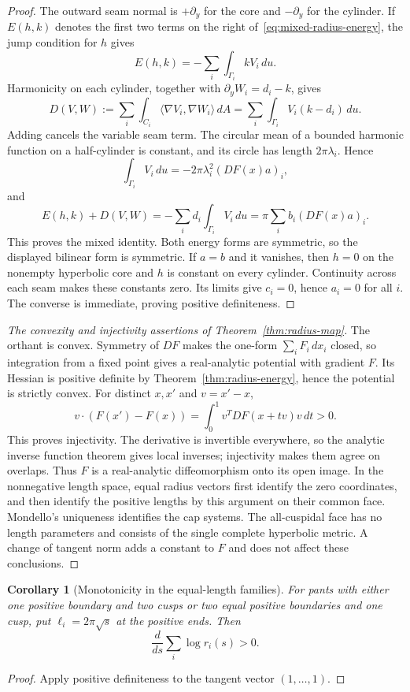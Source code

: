 \documentclass[11pt,a4paper]{article}
\newtheorem{corollary}[theorem]{Corollary}
\theoremstyle{definition}
\begin{document}
\begin{proof}
The outward seam normal is $+\partial_y$ for the core and $-\partial_y$ for the cylinder. If $E(h,k)$ denotes the first two terms on the right of~\eqref{eq:mixed-radius-energy}, the jump condition for $h$ gives
\[
 E(h,k)=-\sum_i\int_{\Gamma_i}kV_i\,du.
\]
Harmonicity on each cylinder, together with $\partial_yW_i=d_i-k$, gives
\[
 D(V,W):=\sum_i\int_{C_i}\langle\nabla V_i,\nabla W_i\rangle\,dA
       =\sum_i\int_{\Gamma_i}V_i(k-d_i)\,du.
\]
Adding cancels the variable seam term. The circular mean of a bounded harmonic function on a half-cylinder is constant, and its circle has length $2\pi\lambda_i$. Hence
\[
 \int_{\Gamma_i}V_i\,du=-2\pi\lambda_i^2(DF(x)a)_i,
\]
and
\[
 E(h,k)+D(V,W)
 =-\sum_i d_i\int_{\Gamma_i}V_i\,du
 =\pi\sum_i b_i(DF(x)a)_i.
\]
This proves the mixed identity. Both energy forms are symmetric, so the displayed bilinear form is symmetric. If $a=b$ and it vanishes, then $h=0$ on the nonempty hyperbolic core and $h$ is constant on every cylinder. Continuity across each seam makes these constants zero. Its limits give $c_i=0$, hence $a_i=0$ for all $i$. The converse is immediate, proving positive definiteness.
\end{proof}

\begin{proof}[The convexity and injectivity assertions of Theorem~\ref{thm:radius-map}]
The orthant is convex. Symmetry of $DF$ makes the one-form $\sum_iF_i\,dx_i$ closed, so integration from a fixed point gives a real-analytic potential with gradient $F$. Its Hessian is positive definite by Theorem~\ref{thm:radius-energy}, hence the potential is strictly convex. For distinct $x,x'$ and $v=x'-x$,
\[
 v\cdot(F(x')-F(x))=\int_0^1v^TDF(x+tv)v\,dt>0.
\]
This proves injectivity. The derivative is invertible everywhere, so the analytic inverse function theorem gives local inverses; injectivity makes them agree on overlaps. Thus $F$ is a real-analytic diffeomorphism onto its open image. In the nonnegative length space, equal radius vectors first identify the zero coordinates, and then identify the positive lengths by this argument on their common face. Mondello's uniqueness identifies the cap systems. The all-cuspidal face has no length parameters and consists of the single complete hyperbolic metric. A change of tangent norm adds a constant to $F$ and does not affect these conclusions.
\end{proof}

\begin{corollary}[Monotonicity in the equal-length families]\label{lem:energy}
For pants with either one positive boundary and two cusps or two equal positive boundaries and one cusp, put $\ell_i=2\pi\sqrt{s}$ at the positive ends. Then
\[
 \frac{d}{ds}\sum_i\log r_i(s)>0.
\]
\end{corollary}
\begin{proof}
Apply positive definiteness to the tangent vector $(1,\ldots,1)$.
\end{proof}
\end{document}
